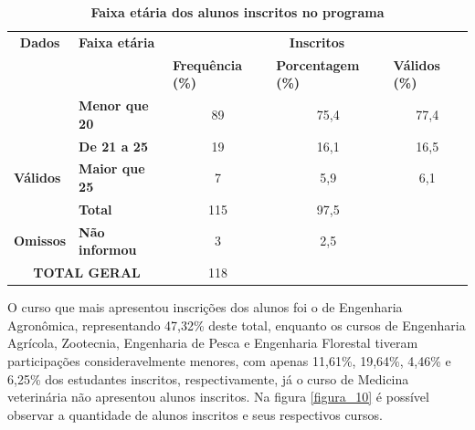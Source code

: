 \begin{table}[!htb]
\centering
\caption{\textbf{Faixa etária dos alunos inscritos no programa}}
\label{tab:tabela_4}
\begin{tabular}{clccc}
\hline \hline
{\textbf{Dados}} & {\color[HTML]{000000} \textbf{Faixa etária}} & \multicolumn{3}{c}{{\color[HTML]{000000} \textbf{Inscritos}}} \\ \cline{1-5}
{\color[HTML]{000000} } & {\color[HTML]{000000} } & \multicolumn{1}{l}{{\color[HTML]{000000} \textbf{Frequência (\%)}}} & \multicolumn{1}{l}{{\color[HTML]{000000} \textbf{Porcentagem (\%)}}} & \multicolumn{1}{l}{{\color[HTML]{000000} \textbf{Válidos (\%)}}} \\
{\color[HTML]{000000} } & {\color[HTML]{000000} \textbf{Menor que 20}} & {\color[HTML]{000000} 89} & {\color[HTML]{000000} 75,4} & {\color[HTML]{000000} 77,4}\\[8pt]
\multirow{-3}{*}{{\color[HTML]{000000} \textbf{}}} & {\color[HTML]{000000} \textbf{De 21 a 25}} & {\color[HTML]{000000} 19} & {\color[HTML]{000000} 16,1} & {\color[HTML]{000000} 16,5} \\[8pt]
\multicolumn{1}{l}{{\color[HTML]{000000} \textbf{Válidos}}} & {\color[HTML]{000000} \textbf{Maior que 25}} & {\color[HTML]{000000} 7} & {\color[HTML]{000000} 5,9} & {\color[HTML]{000000} 6,1}\\[8pt]
\multicolumn{1}{l}{{\color[HTML]{000000} \textbf{}}} & {\color[HTML]{000000} \textbf{Total}} & {\color[HTML]{000000} 115} & {\color[HTML]{000000} 97,5} & {\color[HTML]{000000} } \\[8pt]\hline
\multicolumn{1}{l}{{\color[HTML]{000000} \textbf{Omissos}}} & {\color[HTML]{000000} \textbf{Não informou}} & {\color[HTML]{000000} 3} & {\color[HTML]{000000} 2,5} & {\color[HTML]{000000} } \\[8pt] \hline
\multicolumn{2}{c}{{\color[HTML]{000000} \textbf{TOTAL GERAL}}} & {\color[HTML]{000000} 118} & {\color[HTML]{000000} } & {\color[HTML]{000000} } \\ \hline\hline
\end{tabular}
\end{table}

O curso que mais apresentou inscrições dos alunos foi o de Engenharia Agronômica, representando 47,32\% deste total, enquanto os cursos de Engenharia Agrícola, Zootecnia, Engenharia de Pesca e Engenharia Florestal tiveram participações consideravelmente menores, com apenas 11,61\%, 19,64\%, 4,46\% e 6,25\% dos estudantes inscritos, respectivamente, já o curso de Medicina veterinária não apresentou alunos inscritos. Na figura  \ref{figura_10} é possível observar a quantidade de alunos inscritos e seus respectivos cursos.


